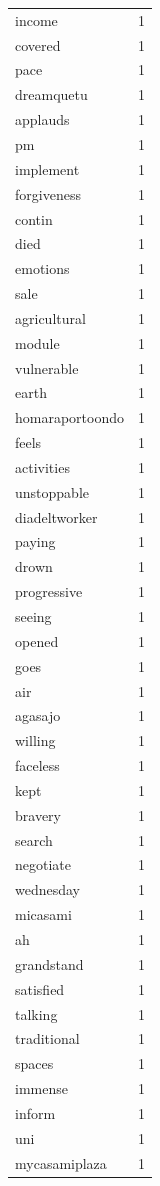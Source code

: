 \begin{tabular}{lr}
income & 1 \\
covered & 1 \\
pace & 1 \\
dreamquetu & 1 \\
applauds & 1 \\
pm & 1 \\
implement & 1 \\
forgiveness & 1 \\
contin & 1 \\
died & 1 \\
emotions & 1 \\
sale & 1 \\
agricultural & 1 \\
module & 1 \\
vulnerable & 1 \\
earth & 1 \\
homaraportoondo & 1 \\
feels & 1 \\
activities & 1 \\
unstoppable & 1 \\
diadeltworker & 1 \\
paying & 1 \\
drown & 1 \\
progressive & 1 \\
seeing & 1 \\
opened & 1 \\
goes & 1 \\
air & 1 \\
agasajo & 1 \\
willing & 1 \\
faceless & 1 \\
kept & 1 \\
bravery & 1 \\
search & 1 \\
negotiate & 1 \\
wednesday & 1 \\
micasami & 1 \\
ah & 1 \\
grandstand & 1 \\
satisfied & 1 \\
talking & 1 \\
traditional & 1 \\
spaces & 1 \\
immense & 1 \\
inform & 1 \\
uni & 1 \\
mycasamiplaza & 1 \\

\end{tabular}
